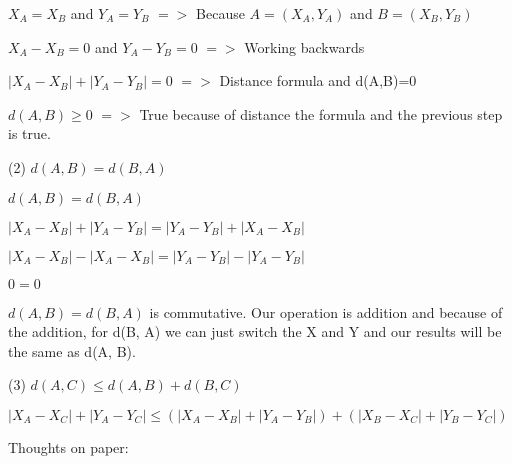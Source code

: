 \documentclass{article}
\begin{document}
\vspace{2mm}

$X_{A}=X_{B}$ and $Y_{A}=Y_{B} $ $=>$ Because $A=(X_{A},Y_{A})$ and $B=(X_{B},Y_{B})$

\vspace{2mm}

 
$ X_{A}-X_{B}=0 $ and $Y_{A}-Y_{B}=0$ $=>$ Working backwards

\vspace{2mm}

$ |X_{A}-X_{B}| + |Y_{A}-Y_{B}|=0$ $=>$ Distance formula and d(A,B)=0

\vspace{2mm}

$d(A, B) \ge 0$ $=>$ True because of distance the formula and the previous step is true. 



\vspace{5mm}
 
	
(2) $d(A, B)=d(B, A)$

\vspace{2mm}

$d(A, B)=d(B, A)$

\vspace{2mm}

$|X_{A}-X_{B}| + |Y_{A}-Y_{B}|=|Y_{A}-Y_{B}|+|X_{A}-X_{B}|$

\vspace{2mm}

$|X_{A}-X_{B}|-|X_{A}-X_{B}|=|Y_{A}-Y_{B}|-|Y_{A}-Y_{B}|$

\vspace{2mm}

$0=0$

\vspace{2mm}

$d(A, B)=d(B, A)$ is commutative. Our operation is addition and because of the addition, for d(B, A) we can just switch the X and Y and our results will be the same as d(A, B).

\vspace{5mm}

\newpage
	
(3) $d(A, C) \le d(A, B)+d(B,C) $

\vspace{2mm}

$|X_{A}-X_{C}| + |Y_{A}-Y_{C}| \le (|X_{A}-X_{B}| + |Y_{A}-Y_{B}|) + (|X_{B}-X_{C}| + |Y_{B}-Y_{C}|)$

\vspace{2mm}

Thoughts on paper:
\end{document}

